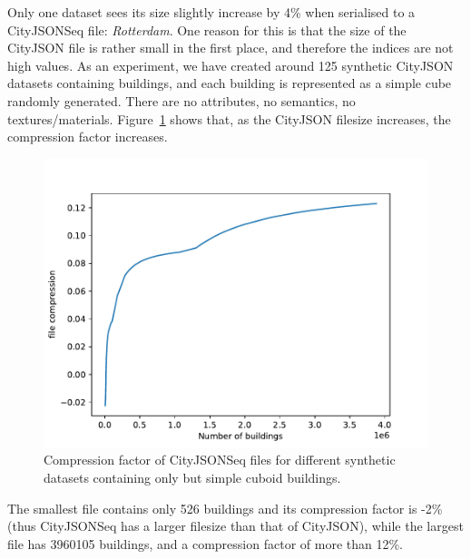 \documentclass{isprs} %
\begin{document}
Only one dataset sees its size slightly increase by 4\% when serialised to a CityJSONSeq file: \emph{Rotterdam}.
One reason for this is that the size of the CityJSON file is rather small in the first place, and therefore the indices are not high values.
As an experiment, we have created around 125 synthetic CityJSON datasets containing buildings, and each building is represented as a simple cube randomly generated.
There are no attributes, no semantics, no textures/materials. 
Figure~\ref{fig:compression_random} shows that, as the CityJSON filesize increases, the compression factor increases.
\begin{figure}
  \centering
  \includegraphics[width=\linewidth]{figs/compression_random.pdf}
  \caption{Compression factor of CityJSONSeq files for different synthetic datasets containing only but simple cuboid buildings.}%
\label{fig:compression_random}
\end{figure}
The smallest file contains only 526 buildings and its compression factor is -2\% (thus CityJSONSeq has a larger filesize than that of CityJSON), while the largest file has \num{3960105} buildings, and a compression factor of more than 12\%.

%
\end{document}
